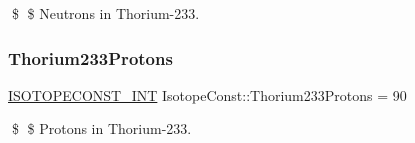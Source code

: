 \$ \$ Neutrons in Thorium-\/233. \mbox{\label{group___isotope_const-_thorium-_th233_ga7d432317e07d429d1b7b385f96773015}} 
\subsubsection{\texorpdfstring{Thorium233\+Protons}{Thorium233Protons}}
{\footnotesize\ttfamily \mbox{\hyperlink{group___isotope_const-_macros_ga5f18360b3e99483a35c32d789e62621c}{I\+S\+O\+T\+O\+P\+E\+C\+O\+N\+S\+T\+\_\+\+I\+NT}} Isotope\+Const\+::\+Thorium233\+Protons = 90}

\$ \$ Protons in Thorium-\/233. 